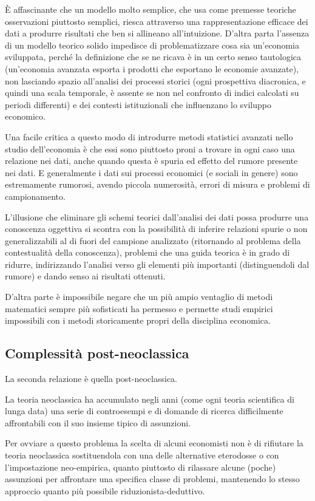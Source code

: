 \documentclass[a4paper, headings=standardclasses]{scrartcl}
\begin{document}
È affascinante che un modello molto semplice, che usa come premesse teoriche osservazioni piuttosto semplici, riesca attraverso una rappresentazione efficace dei dati a produrre risultati che ben si allineano all'intuizione.
D'altra parta l'assenza di un modello teorico solido impedisce di problematizzare cosa sia un'economia sviluppata, perché la definizione che se ne ricava è in un certo senso tautologica (un'economia avanzata esporta i prodotti che esportano le economie avanzate), non lasciando spazio all'analisi dei processi storici (ogni prospettiva diacronica, e quindi una scala temporale, è assente se non nel confronto di indici calcolati su periodi differenti) e dei contesti istituzionali che influenzano lo sviluppo economico.

Una facile critica a questo modo di introdurre metodi statistici avanzati nello studio dell'economia è che essi sono piuttosto proni a trovare in ogni caso una relazione nei dati, anche quando questa è spuria ed effetto del rumore presente nei dati. E generalmente i dati sui processi economici (e sociali in genere) sono estremamente rumorosi, avendo piccola numerosità, errori di misura e problemi di campionamento.

L'illusione che eliminare gli schemi teorici dall'analisi dei dati possa produrre una conoscenza oggettiva si scontra con la possibilità di inferire relazioni spurie o non generalizzabili al di fuori del campione analizzato (ritornando al problema della contestualità della conoscenza), problemi che una guida teorica è in grado di ridurre, indirizzando l'analisi verso gli elementi più importanti (distinguendoli dal rumore) e dando senso ai risultati ottenuti.

D'altra parte è impossibile negare che un più ampio ventaglio di metodi matematici sempre più sofisticati ha permesso e permette studi empirici impossibili con i metodi storicamente propri della disciplina economica.

\subsection{Complessità post-neoclassica}
La seconda relazione è quella post-neoclassica.

La teoria neoclassica ha accumulato negli anni (come ogni teoria scientifica di lunga data) una serie di controesempi e di domande di ricerca difficilmente affrontabili con il suo insieme tipico di assunzioni.

Per ovviare a questo problema la scelta di alcuni economisti non è di rifiutare la teoria neoclassica sostituendola con una delle alternative eterodosse o con l'impostazione neo-empirica, quanto piuttosto di rilassare alcune (poche) assunzioni per affrontare una specifica classe di problemi, mantenendo lo stesso approccio quanto più possibile riduzionista-deduttivo.
\end{document}
